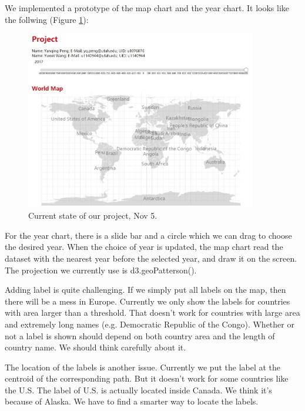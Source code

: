 \documentclass[12pt, fullpage,letterpaper]{article}
\begin{document}
We implemented a prototype of the map chart and the year chart.
It looks like the follwing (Figure \ref{fig:nov5}):

\begin{figure}[h!]
    \begin{center}
        \includegraphics[width=0.9\textwidth]{figs/Nov5.jpg}
        \caption{Current state of our project, Nov 5.}
        \label{fig:nov5}
    \end{center}
\end{figure}

For the year chart, there is a slide bar and a circle which we can drag to choose the desired year.
When the choice of year is updated, the map chart read the dataset with the nearest year before the selected year,
and draw it on the screen. The projection we currently use is d3.geoPatterson().

Adding label is quite challenging. If we simply put all labels on the map,
then there will be a mess in Europe. Currently we only show the labels for countries
with area larger than a threshold. That doesn't work for countries with large area and extremely
long names (e.g. Democratic Republic of the Congo). Whether or not a label is shown
should depend on both country area and the length of country name. We should think carefully about it.

The location of the labels is another issue. Currently we put the label
at the centroid of the corresponding path. But it doesn't work for some countries like the U.S.
The label of U.S. is actually located inside Canada. We think it's because of Alaska.
We have to find a smarter way to locate the labels.
\end{document}
